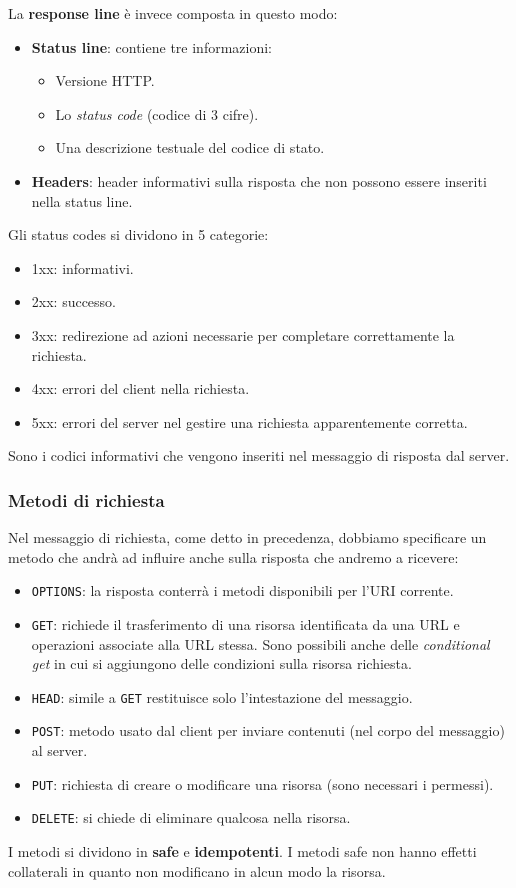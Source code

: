 La \textbf{response line} è invece composta in questo modo:
\begin{itemize}
	\item \textbf{Status line}: contiene tre informazioni:
		\begin{itemize}
			\item Versione HTTP.
			\item Lo \emph{status code} (codice di 3 cifre).
			\item Una descrizione testuale del codice di stato.
		\end{itemize}
	\item \textbf{Headers}: header informativi sulla risposta che non 
		possono essere inseriti nella status line.
\end{itemize}
Gli status codes si dividono in 5 categorie:
\begin{itemize}
	\item 1xx: informativi.
	\item 2xx: successo.
	\item 3xx: redirezione ad azioni necessarie per completare 
		correttamente la richiesta.
	\item 4xx: errori del client nella richiesta.
	\item 5xx: errori del server nel gestire una richiesta 
		apparentemente corretta.
\end{itemize}
Sono i codici informativi che vengono inseriti nel messaggio di 
risposta dal server.

\subsubsection{Metodi di richiesta}
Nel messaggio di richiesta, come detto in precedenza, dobbiamo 
specificare un metodo che andrà ad influire anche sulla risposta che 
andremo a ricevere:
\begin{itemize}
	\item \verb|OPTIONS|: la risposta conterrà i metodi disponibili 
		per l'URI corrente.
	\item \verb|GET|: richiede il trasferimento di una risorsa 
		identificata da una URL e operazioni associate alla URL stessa.
		Sono possibili anche delle \emph{conditional get} in cui si
		aggiungono delle condizioni sulla risorsa richiesta.
	\item \verb|HEAD|: simile a \verb|GET| restituisce solo 
		l'intestazione del messaggio.
	\item \verb|POST|: metodo usato dal client per inviare contenuti 
		(nel corpo del messaggio) al server.
	\item \verb|PUT|: richiesta di creare o modificare una risorsa 
		(sono necessari i permessi).
	\item \verb|DELETE|: si chiede di eliminare qualcosa nella risorsa.
\end{itemize}
I metodi si dividono in \textbf{safe} e \textbf{idempotenti}. I metodi 
safe non hanno effetti collaterali in quanto non modificano in alcun 
modo la risorsa.

